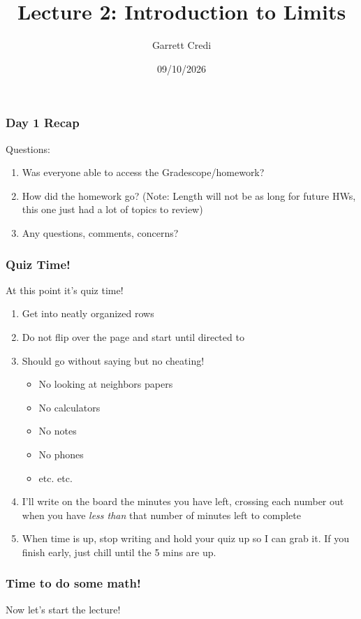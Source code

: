 \documentclass{ltx-talk}
\title{Lecture 2: Introduction to Limits}
\author{Garrett Credi}
\date{09/10/2026}
\begin{document}
\begin{frame}
  \maketitle
\end{frame}

\begin{frame}
  \frametitle{Day 1 Recap}

  Questions: \pause
  \begin{enumerate}
    \item Was everyone able to access the Gradescope/homework? \pause
    \item How did the homework go? (Note: Length will not be as long for future HWs, this one just had a lot of topics to review) \pause
    \item Any questions, comments, concerns?
  \end{enumerate}
\end{frame}

\begin{frame}
  \frametitle{Quiz Time!}

  At this point it's quiz time! \pause

  \begin{enumerate}
    \item Get into neatly organized rows
    \item Do not flip over the page and start until directed to
    \item Should go without saying but no cheating!
      \begin{itemize}
        \item No looking at neighbors papers
        \item No calculators
        \item No notes
        \item No phones
        \item etc. etc.
      \end{itemize}
    \item I'll write on the board the minutes you have left, crossing each number out when you have \textit{less than} that number of minutes left to complete
    \item When time is up, stop writing and hold your quiz up so I can grab it. If you finish early, just chill until the 5 mins are up.
  \end{enumerate}
\end{frame}

\begin{frame}
  \frametitle{Time to do some math!}

  Now let's start the lecture!
\end{frame}
\end{document}

